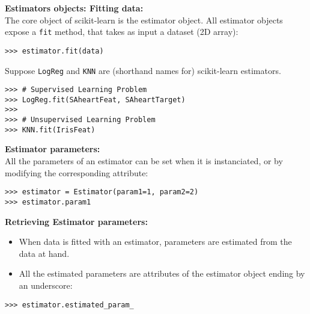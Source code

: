 \documentclass[SKL-MASTER.tex]{subfiles}
\begin{document}
\LARGE

\noindent \textbf{Estimators objects: Fitting data:}\\The core object of scikit-learn is the estimator object. All estimator objects expose a \texttt{fit} method, that takes as input a dataset (2D array):

\begin{framed}
\begin{verbatim}
>>> estimator.fit(data)
\end{verbatim}
\end{framed}

\noindent Suppose \texttt{LogReg} and \texttt{KNN} are (shorthand names for) scikit-learn estimators.
\begin{framed}
\begin{verbatim}
>>> # Supervised Learning Problem
>>> LogReg.fit(SAheartFeat, SAheartTarget)
>>>
>>> # Unsupervised Learning Problem
>>> KNN.fit(IrisFeat)
\end{verbatim}
\end{framed}

\newpage
\noindent \textbf{Estimator parameters:}\\
All the parameters of an estimator can be set when it is instanciated, or by modifying the corresponding attribute:

\begin{framed}
\begin{verbatim}
>>> estimator = Estimator(param1=1, param2=2)
>>> estimator.param1
\end{verbatim}
\end{framed}


\noindent \textbf{Retrieving Estimator parameters:}\\ 
\begin{itemize}
\item When data is fitted with an estimator, parameters are estimated from the data at hand.
\item All the estimated parameters are attributes of the estimator object ending by an underscore:
\end{itemize}
\begin{framed}
\begin{verbatim}
>>> estimator.estimated_param_ 
\end{verbatim}
\end{framed}
\end{document}
